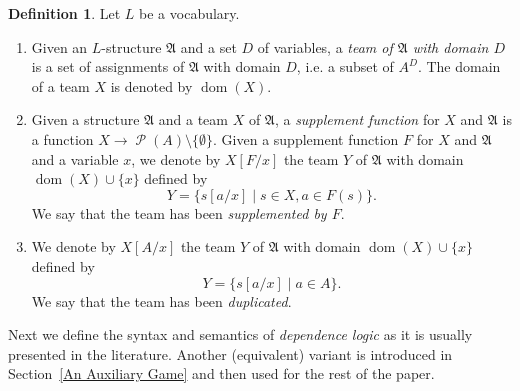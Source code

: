 \documentclass[12pt]{article}
\theoremstyle{definition}
\newtheorem{definition}{Definition}[section]
\newcommand{\A}{\mathfrak{A}}
\DeclareMathOperator{\Pow}{\mathcal{P}}
\DeclareMathOperator{\dom}{dom}
\begin{document}
\begin{definition}
    Let $L$ be a vocabulary.
    \begin{enumerate}
        \item Given an $L$-structure $\A$ and a set $D$ of variables, a \emph{team of $\A$ with domain $D$} is a set of assignments of $\A$ with domain $D$, i.e. a subset of $A^D$. The domain of a team $X$ is denoted by $\dom(X)$.
        \item Given a structure $\A$ and a team $X$ of $\A$, a \emph{supplement function} for $X$ and $\A$ is a function $X\to\Pow(A)\setminus\{\emptyset\}$. Given a supplement function $F$ for $X$ and $\A$ and a variable $x$, we denote by $X[F/x]$ the team $Y$ of $\A$ with domain $\dom(X)\cup\{x\}$ defined by
        \[
            Y = \{ s[a/x] \mid s\in X, a\in F(s) \}.
        \]
        We say that the team has been \emph{supplemented by $F$}.
        \item We denote by $X[A/x]$ the team $Y$ of $\A$ with domain $\dom(X)\cup\{x\}$ defined by
        \[
            Y = \{ s[a/x] \mid a\in A \}.
        \]
        We say that the team has been \emph{duplicated}.
    \end{enumerate}
\end{definition}

Next we define the syntax and semantics of \emph{dependence logic} as it is usually presented in the literature. Another (equivalent) variant is introduced in Section~\ref{An Auxiliary Game} and then used for the rest of the paper.
\end{document}
